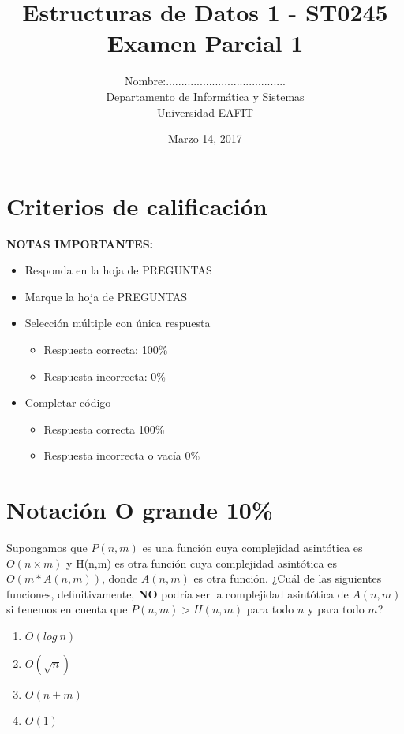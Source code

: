 \documentclass[twocolumn]{article}
\author{
Nombre:....................................... \\
    Departamento de Informática y Sistemas \\
    Universidad EAFIT \\
}
\title{
    Estructuras de Datos 1 - ST0245 \\
    Examen Parcial 1
}
\date{
    Marzo 14, 2017
}
\begin{document}
\vspace{-5cm}
\maketitle


\section*{Criterios de calificación}

\textbf{NOTAS IMPORTANTES:}
\begin{itemize}
	\item Responda en la hoja de PREGUNTAS
	\item Marque la hoja de PREGUNTAS
\end{itemize}

\begin{itemize}
\item Selección múltiple con única respuesta
\begin{itemize}
\item Respuesta correcta: 100\%
\item Respuesta incorrecta: 0\%
\end{itemize}

\item Completar código
\begin{itemize}
\item Respuesta correcta 100\%
\item Respuesta incorrecta o vacía 0\%
\end{itemize}
\end{itemize}




\section{Notación O grande 10\%}
Supongamos que $P(n,m)$ es una función cuya complejidad asintótica es 
$O (n \times m)$ y H(n,m) es otra función cuya complejidad asintótica es $O(m * A (n,m))$, donde $A(n,m)$ es otra función. ¿Cuál de las siguientes funciones, definitivamente, \textbf{NO} podría ser la complejidad asintótica de $A(n,m)$ si tenemos en cuenta que $P(n,m) > H(n,m)$ para todo $n$ y para todo $m$?

\begin{enumerate}[label=\Alph*]
	\item $O (log\ n)$
	\item $O (\sqrt{n})$
	\item $O (n + m)$
	\item $O (1 )$
\end{enumerate}
\end{document}

